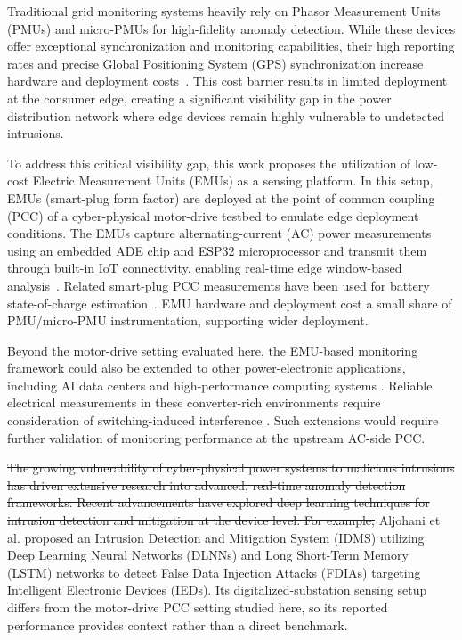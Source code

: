 \documentclass[conference,letterpaper]{IEEEtran}
\providecommand{\DIFdel}[1]{{\protect\color{red}\sout{#1}}}                      %
\providecommand{\DIFdelbegin}{} %
\providecommand{\DIFdelend}{} %
\begin{document}
Traditional grid monitoring systems heavily rely on Phasor Measurement Units (PMUs) and micro-PMUs for high-fidelity anomaly detection. While these devices offer exceptional synchronization and monitoring capabilities, their high reporting rates and precise Global Positioning System (GPS) synchronization increase hardware and deployment costs~\cite{vonmeier2017}. This cost barrier results in limited deployment at the consumer edge, creating a significant visibility gap in the power distribution network where edge devices remain highly vulnerable to undetected intrusions.

To address this critical visibility gap, this work proposes the utilization of low-cost Electric Measurement Units (EMUs) as a sensing platform. In this setup, EMUs (smart-plug form factor) are deployed at the point of common coupling (PCC) of a cyber-physical motor-drive testbed to emulate edge deployment conditions. The EMUs capture alternating-current (AC) power measurements using an embedded ADE chip and ESP32 microprocessor and transmit them through built-in IoT connectivity, enabling real-time edge window-based analysis~\cite{najarEMU2026}. Related smart-plug PCC measurements have been used for battery state-of-charge estimation~\cite{najarSOC2026}. EMU hardware and deployment cost a small share of PMU/micro-PMU instrumentation, supporting wider deployment.

Beyond the motor-drive setting evaluated here, the EMU-based monitoring framework could also be extended to other power-electronic applications, including AI data centers and high-performance computing systems \cite{Habibi2026DataCenters,Lotfi2026FCML}.
Reliable electrical measurements in these converter-rich environments require consideration of switching-induced interference \cite{Omidi2026HybridSensor}.
Such extensions would require further validation of monitoring performance at the upstream AC-side PCC.



\DIFdelbegin \DIFdel{The growing vulnerability of cyber-physical power systems to malicious intrusions has driven extensive research into advanced, real-time anomaly detection frameworks. Recent advancements have explored deep learning techniques for intrusion detection and mitigation at the device level. For example, }\DIFdelend Aljohani et al. \cite{aljohani2024} proposed an Intrusion Detection and Mitigation System (IDMS) utilizing Deep Learning Neural Networks (DLNNs) and Long Short-Term Memory (LSTM) networks to detect False Data Injection Attacks (FDIAs) targeting Intelligent Electronic Devices (IEDs). Its digitalized-substation sensing setup differs from the motor-drive PCC setting studied here, so its reported performance provides context rather than a direct benchmark.
\end{document}
